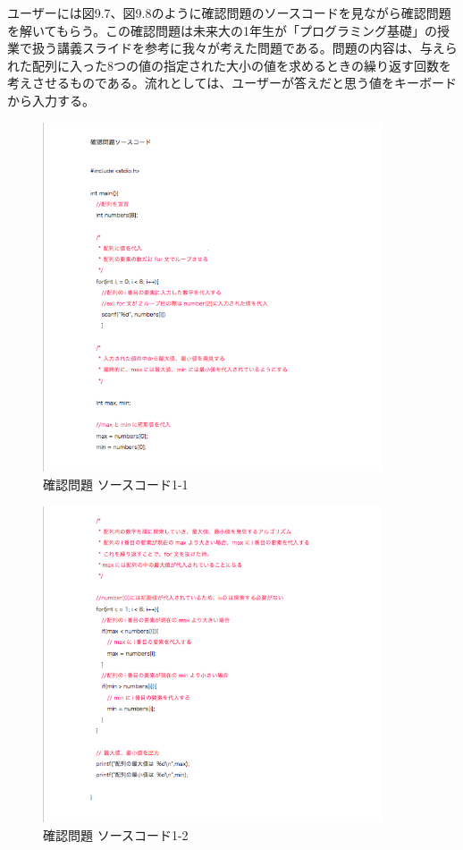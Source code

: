 \documentclass[openany,11pt,papersize]{jsbook}
\begin{document}
ユーザーには図9.7、図9.8のように確認問題のソースコードを見ながら確認問題を解いてもらう。この確認問題は未来大の1年生が「プログラミング基礎」の授業で扱う講義スライドを参考に我々が考えた問題である。問題の内容は、与えられた配列に入った8つの値の指定された大小の値を求めるときの繰り返す回数を考えさせるものである。流れとしては、ユーザーが答えだと思う値をキーボードから入力する。

\begin{figure}[H]
\begin{center}
\includegraphics[width=10cm, bb=0 0 557 576]{img/9thParagraph/kakuninmondai_03.png}
\end{center}
\caption{確認問題 ソースコード1-1}
\end{figure}

\begin{figure}[H]
\begin{center}
\includegraphics[width=10cm, bb=0 0 557 521]{img/9thParagraph/kakuninmondai_04.png}
\end{center}
\caption{確認問題 ソースコード1-2}
\end{figure}
\end{document}
